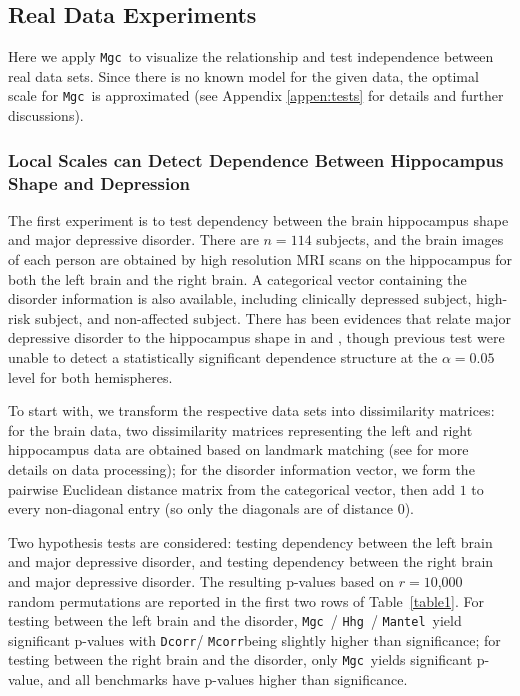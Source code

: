 \documentclass[11pt]{article}
\providecommand{\sct}[1]{{\sc \texttt{#1}}}
\newcommand{\Mgc}{\sct{Mgc}}
\newcommand{\Hhg}{\sct{Hhg}}
\newcommand{\Dcorr}{\sct{Dcorr}}
\newcommand{\Mcorr}{\sct{Mcorr}}
\newcommand{\Mantel}{\sct{Mantel}}
\begin{document}
\subsection{Real Data Experiments}

\label{numer3}
Here we apply  \Mgc~to visualize the relationship and test independence between real data sets. Since there is no known model for the given data, the optimal scale for \Mgc~is approximated (see Appendix \ref{appen:tests} for details and further discussions). 

\subsubsection[Brain Shape and Depression]{Local Scales can Detect Dependence Between Hippocampus Shape and Depression}

The first experiment is to test dependency between the brain hippocampus shape and major depressive disorder. There are $n=114$ subjects, and the brain images of each person are obtained by high resolution MRI scans on the hippocampus for both the left brain and the right brain. A categorical vector containing the disorder information is also available, including clinically depressed subject, high-risk subject, and non-affected subject. There has been evidences that relate major depressive disorder to the hippocampus shape in \cite{ParkEtAl2011} and \cite{PosenerEtAl2003}, though previous test were unable to detect a statistically significant dependence structure at the $\alpha=0.05$ level for both hemispheres. 

To start with, we transform the respective data sets into dissimilarity matrices: for the brain data, two dissimilarity matrices representing the left and right hippocampus data are obtained based on landmark matching (see \cite{ParkEtAl2011} for more details on data processing); for the disorder information vector,
we form the pairwise Euclidean distance matrix from the categorical vector, then add $1$ to every non-diagonal entry (so only the diagonals are of distance $0$).

Two hypothesis tests are considered: testing dependency between the left brain and major depressive disorder, and testing dependency between the right brain and major depressive disorder. The resulting p-values based on $r=10$,$000$ random permutations are reported in the first two rows of Table~\ref{table1}. For testing between the left brain and the disorder, \Mgc~/ \Hhg~/ \Mantel~yield significant p-values with \Dcorr / \Mcorr being slightly higher than significance; for testing between the right brain and the disorder, only \Mgc~yields significant p-value, and all benchmarks have p-values higher than significance. 
\end{document}
